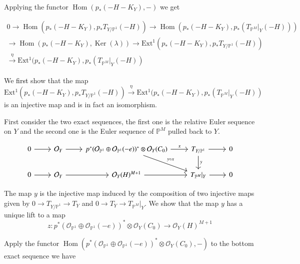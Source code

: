 \documentclass[11pt,twoside]{amsart}
\theoremstyle{plain}
\numberwithin{equation}{section}
\theoremstyle{definition}
\begin{document}
Applying the functor $\operatorname{Hom}(p_*(-H-K_Y),-)$ we get 

\begin{multline}\label{30}
0 \to \operatorname{Hom}(p_*(-H-K_Y), 
 p_*T_{Y/\mathbb{P}^1}(-H))  \to \operatorname{Hom}(p_*(-H-K_Y), p_*(T_{\mathbb{P}^M}|_Y(-H))) \\ \to \operatorname{Hom}(p_*(-H-K_Y),\operatorname{Ker}(\lambda)) \to \operatorname{Ext^1}(p_*(-H-K_Y), 
 p_*T_{Y/\mathbb{P}^1}(-H)) \\ \xrightarrow[]{\eta} \operatorname{Ext^1}(p_*(-H-K_Y), 
 p_*(T_{\mathbb{P}^M}|_Y(-H))
\end{multline}


We \textcolor{black}{first} show that the map $\operatorname{Ext^1}(p_*(-H-K_Y), 
 p_*T_{Y/\mathbb{P}^1}(-H))  \xrightarrow[]{\eta} \operatorname{Ext^1}(p_*(-H-K_Y), 
 p_*(T_{\mathbb{P}^M}|_Y(-H))$ is an injective map and is in fact an isomorphism. 

\color{black}

First consider the two exact sequences, the first one is the relative Euler sequence on $Y$ and the second one is the Euler sequence of $\mathbb{P}^M$ pulled back to $Y$.

\[
\begin{tikzcd}
  0 \arrow[r] & \mathcal{O}_Y \arrow[r] & p^*(\mathcal{O}_{\mathbb{P}^1} \oplus \mathcal{O}_{\mathbb{P}^1}(-e))^* \otimes \mathcal{O}_{Y}(C_0) \arrow[r, "x"] \arrow[dr, "y \circ x"] & T_{Y/\mathbb{P}^1} \arrow[r] \arrow[d, "y"] & 0 \\
   0 \arrow[r] & \mathcal{O}_Y \arrow[r] & \mathcal{O}_Y(H)^{M+1} \arrow[r] & T_{\mathbb{P}^M}|_Y \arrow[r] & 0
\end{tikzcd}
\]

The map $y$ is the injective map induced by the composition of two injective maps given by $0 \to T_{Y/\mathbb{P}^1} \to T_Y$ and $0 \to T_Y \to T_{\mathbb{P}^M}|_Y$. We show that the map $y$ has a unique lift to a map $$z: p^*(\mathcal{O}_{\mathbb{P}^1} \oplus \mathcal{O}_{\mathbb{P}^1}(-e))^* \otimes \mathcal{O}_Y(C_0) \to \mathcal{O}_Y(H)^{M+1}$$

Apply the functor $\operatorname{Hom}(p^*(\mathcal{O}_{\mathbb{P}^1} \oplus \mathcal{O}_{\mathbb{P}^1}(-e))^* \otimes \mathcal{O}_Y(C_0), -)$ to the bottom exact sequence we have 
\end{document}
